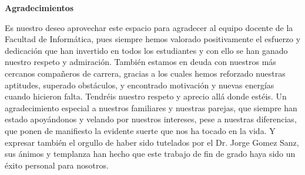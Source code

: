 
\newpage
\begin{center}
{\bf \Huge Agradecimientos}
\end{center}
\vspace{1cm}
\setlength{\baselineskip}{0.8cm}



Es nuestro deseo aprovechar este espacio para agradecer al equipo docente de la Facultad de Informática, pues siempre hemos valorado positivamente el esfuerzo y dedicación que han invertido en todos los estudiantes y con ello se han ganado nuestro respeto y admiración. También estamos en deuda con nuestros más cercanos compañeros de carrera, gracias a los cuales hemos reforzado nuestras aptitudes, superado obstáculos, y encontrado motivación y nuevas energías cuando hicieron falta. Tendréis nuestro respeto y aprecio allá donde estéis. Un agradecimiento especial a nuestros familiares y nuestras parejas, que siempre han estado apoyándonos y velando por nuestros intereses, pese a nuestras diferencias, que ponen de manifiesto la evidente suerte que nos ha tocado en la vida. Y expresar también el orgullo de haber sido tutelados por el Dr. Jorge Gomez Sanz, sus ánimos y templanza han hecho que este trabajo de fin de grado haya sido un éxito personal para nosotros.
